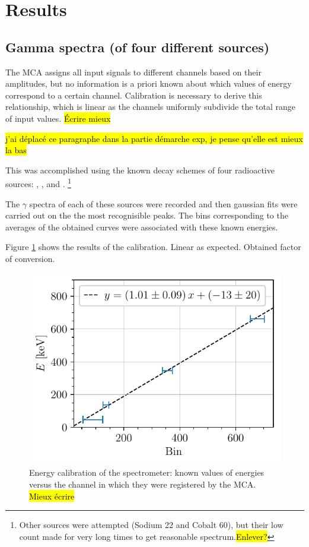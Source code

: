 \section{Results}
\subsection{Gamma spectra (of four different sources)}
The MCA assigns all input signals to different channels based on their amplitudes, but no information is a priori known about which values of energy correspond to a certain channel.
Calibration is necessary to derive this relationship, which is linear
as the channels uniformly subdivide the total range of input values. \hl{Écrire mieux}

\hl{j'ai déplacé ce paragraphe dans la partie démarche exp, je pense qu'elle est mieux la bas}


This was accomplished using the known decay schemes\cite{notice_generale} of four radioactive sources: \cesium, \cobalt, \lead and \hafnium.
\footnote{Other sources were attempted (Sodium 22 and Cobalt 60), but their low count made for very long times to get reasonable spectrum.\hl{Enlever?}}

The $\gamma$ spectra of each of these sources were recorded and then gaussian fits were carried out on the the most recognisible peaks.
The bins corresponding to the averages of the obtained curves were associated with these known energies.

Figure \ref{fig:calibration_energy} shows the results of the calibration.
Linear as expected. Obtained factor of conversion.
\begin{figure}[htbp]
    \centering
    \includegraphics[scale=1]{figures/calibration_energy.pdf}
    \caption{Energy calibration of the spectrometer: known values of energies versus the channel in which they were registered by the MCA. \hl{Mieux écrire}}
    \label{fig:calibration_energy}
\end{figure}

